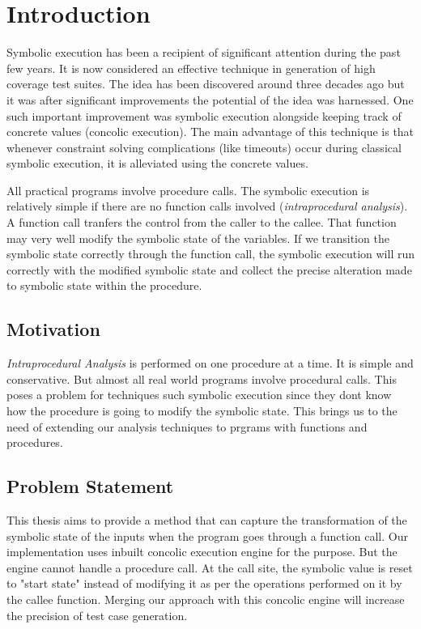\documentclass[12pt,oneside]{book}
\begin{document}
\chapter{Introduction}


\hspace {0.4 cm}
Symbolic execution has been a recipient of significant attention during the past few years. It is now considered an effective technique in generation of high coverage test suites. The idea has been discovered around three decades ago but it was after significant improvements the potential of the idea was harnessed. One such important improvement was symbolic execution alongside keeping track of concrete values (concolic execution). The main advantage of this technique is that whenever constraint solving complications (like timeouts) occur during classical symbolic execution, it is alleviated using the concrete values.

All practical programs involve procedure calls. The symbolic execution is relatively simple if there are no function calls involved (\textit{intraprocedural analysis}). A function call tranfers the control from the caller to the callee. That function may very well modify the symbolic state of the variables. If we transition the symbolic state correctly through the function call, the symbolic execution will run correctly with the modified symbolic state and collect the precise alteration made to symbolic state within the procedure.    


\section{Motivation}
\textit{Intraprocedural Analysis} is performed on one procedure at a time. It is simple and conservative. But almost all real world programs involve procedural calls. This poses a problem for techniques such symbolic execution since they dont know how the procedure is going to modify the symbolic state. This brings us to the need of extending our analysis techniques to prgrams with functions and procedures.


\section{Problem Statement}
This thesis aims to provide a method that can capture the transformation of the symbolic state of the inputs when the program goes through a function call. Our implementation uses inbuilt concolic execution engine for the purpose. But the engine cannot handle a procedure call. At the call site, the symbolic value is reset to "start state" instead of modifying it as per the operations performed on it by the callee function. Merging our approach with this concolic engine will increase the precision of test case generation. 
\end{document}
